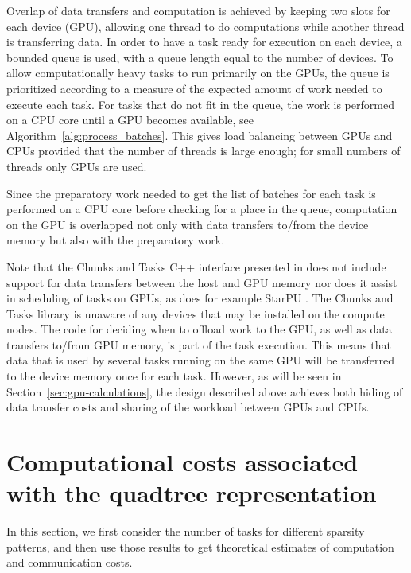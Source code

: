 \documentclass{elsarticle}
\begin{document}
Overlap of data transfers and computation is achieved by keeping two
slots for each device (GPU), allowing one thread to do computations
while another thread is transferring data. In order to have a task
ready for execution on each device, a bounded queue is used, with a
queue length equal to the number of devices. To allow computationally
heavy tasks to run primarily on the GPUs, the queue is prioritized
according to a measure of the expected amount of work needed to
execute each task.  For tasks that do not fit in the queue, the work
is performed on a CPU core until a GPU becomes available, see
Algorithm~\ref{alg:process_batches}. This gives load balancing between
GPUs and CPUs provided that the number of threads is large enough; for
small numbers of threads only GPUs are used.

Since the preparatory work needed to get the list of batches for each
task is performed on a CPU core before checking for a place in the
queue, computation on the GPU is overlapped not only with data
transfers to/from the device memory but also with the preparatory
work.

Note that the Chunks and Tasks C++ interface presented in
\cite{chunks-and-tasks} does not include support for data transfers
between the host and GPU memory nor does it assist in scheduling of
tasks on GPUs, as does for example StarPU \cite{starpu}. The Chunks
and Tasks library is unaware of any devices that may be installed on
the compute nodes.
The code for deciding when to offload work to the GPU, as well as data
transfers to/from GPU memory, is part of the task execution. This
means that data that is used by several tasks running on the same GPU
will be transferred to the device memory once for each task.
However, as will be seen in Section~\ref{sec:gpu-calculations}, the
design described above achieves both hiding of data
transfer costs and sharing of the workload between GPUs and CPUs.


\section{Computational costs associated with the quadtree representation}\label{sec:quadtree-effects}


In this section, we first consider the number of tasks for different
sparsity patterns, and then use those results to get theoretical
estimates of computation and communication costs.
\end{document}
